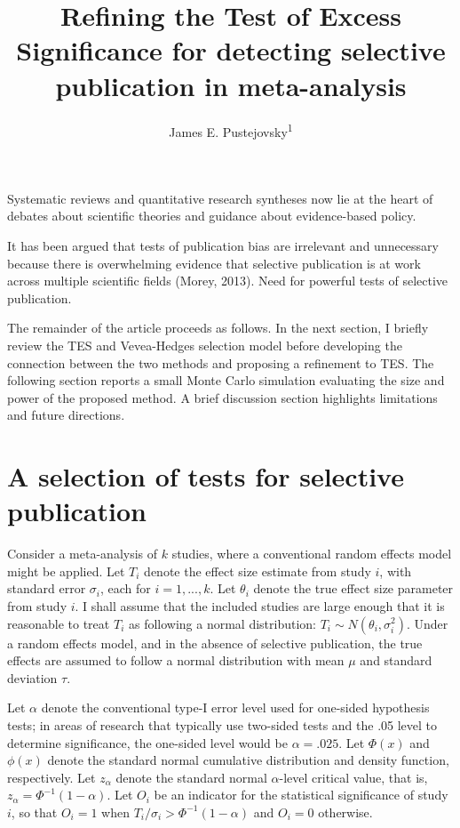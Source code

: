 \documentclass[man,floatsintext]{apa6}
\title{Refining the Test of Excess Significance for detecting selective publication in meta-analysis}
\author{James E. Pustejovsky\textsuperscript{1}}
\date{}
\affiliation{
\vspace{0.5cm}
\textsuperscript{1} University of Texas at Austin}
\begin{document}
\maketitle

Systematic reviews and quantitative research syntheses now lie at the heart of debates about scientific theories and guidance about evidence-based policy.

It has been argued that tests of publication bias are irrelevant and unnecessary because there is overwhelming evidence that selective publication is at work across multiple scientific fields (Morey, 2013).
Need for powerful tests of selective publication.

The remainder of the article proceeds as follows.
In the next section, I briefly review the TES and Vevea-Hedges selection model before developing the connection between the two methods and proposing a refinement to TES.
The following section reports a small Monte Carlo simulation evaluating the size and power of the proposed method.
A brief discussion section highlights limitations and future directions.

\hypertarget{tests}{%
\section{A selection of tests for selective publication}\label{tests}}

Consider a meta-analysis of \(k\) studies, where a conventional random effects model might be applied.
Let \(T_i\) denote the effect size estimate from study \(i\), with standard error \(\sigma_i\), each for \(i = 1,...,k\). Let \(\theta_i\) denote the true effect size parameter from study \(i\).
I shall assume that the included studies are large enough that it is reasonable to treat \(T_i\) as following a normal distribution: \(T_i \sim N(\theta_i, \sigma_i^2)\).
Under a random effects model, and in the absence of selective publication, the true effects are assumed to follow a normal distribution with mean \(\mu\) and standard deviation \(\tau\).

Let \(\alpha\) denote the conventional type-I error level used for one-sided hypothesis tests; in areas of research that typically use two-sided tests and the .05 level to determine significance, the one-sided level would be \(\alpha = .025\).
Let \(\Phi(x)\) and \(\phi(x)\) denote the standard normal cumulative distribution and density function, respectively.
Let \(z_\alpha\) denote the standard normal \(\alpha\)-level critical value, that is, \(z_\alpha = \Phi^{-1}(1 - \alpha)\).
Let \(O_i\) be an indicator for the statistical significance of study \(i\), so that \(O_i = 1\) when \(T_i / \sigma_i > \Phi^{-1}(1 - \alpha)\) and \(O_i = 0\) otherwise.
\end{document}
